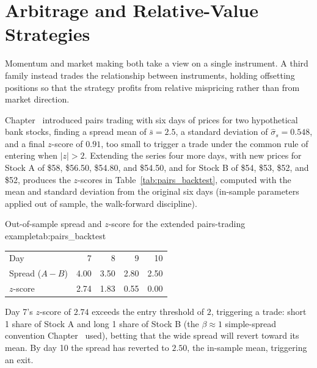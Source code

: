 \documentclass[../ai_in_finance]{subfiles}
\begin{document}
\section{Arbitrage and Relative-Value Strategies}

Momentum and market making both take a view on a single instrument. A third family instead trades the relationship between instruments, holding offsetting positions so that the strategy profits from relative mispricing rather than from market direction.

\label{sec:pairs-backtest}

Chapter~ introduced pairs trading with six days of prices for two hypothetical bank stocks, finding a spread mean of $\bar s=2.5$, a standard deviation of $\hat\sigma_s=0.548$, and a final $z$-score of $0.91$, too small to trigger a trade under the common rule of entering when $|z|>2$. Extending the series four more days, with new prices for Stock A of \$58, \$56.50, \$54.80, and \$54.50, and for Stock B of \$54, \$53, \$52, and \$52, produces the $z$-scores in Table~\ref{tab:pairs_backtest}, computed with the mean and standard deviation from the original six days (in-sample parameters applied out of sample, the walk-forward discipline).

\begin{booktable}[htbp]{Out-of-sample spread and $z$-score for the extended pairs-trading example}{tab:pairs_backtest}
\begin{tabular}{lrrrr}
\toprule
Day & 7 & 8 & 9 & 10 \\
Spread ($A-B$) & 4.00 & 3.50 & 2.80 & 2.50 \\
$z$-score & 2.74 & 1.83 & 0.55 & 0.00 \\
\bottomrule
\end{tabular}
\end{booktable}

Day 7's $z$-score of $2.74$ exceeds the entry threshold of $2$, triggering a trade: short 1 share of Stock A and long 1 share of Stock B (the $\beta\approx 1$ simple-spread convention Chapter~ used), betting that the wide spread will revert toward its mean. By day 10 the spread has reverted to $2.50$, the in-sample mean, triggering an exit.
\end{document}

